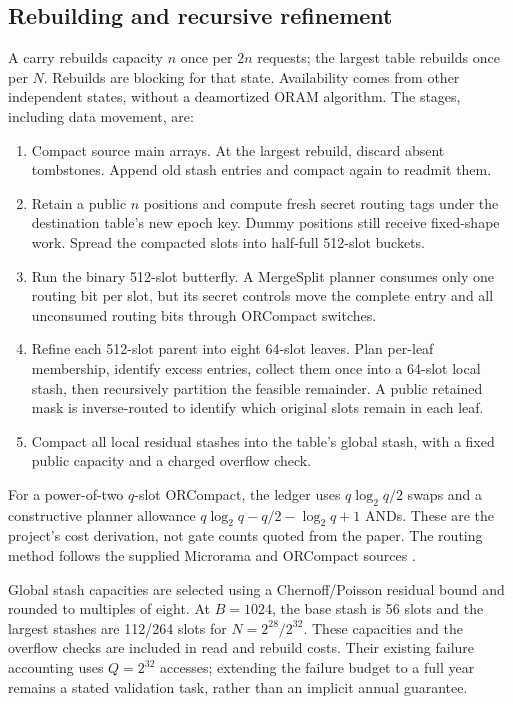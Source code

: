 \documentclass[11pt]{article}
\begin{document}
\subsection{Rebuilding and recursive refinement}
A carry rebuilds capacity $n$ once per $2n$ requests; the largest table
rebuilds once per $N$. Rebuilds are blocking for that state. Availability
comes from other independent states, without a deamortized ORAM algorithm.
The stages, including data movement, are:
\begin{enumerate}
\item Compact source main arrays. At the largest rebuild, discard absent
tombstones. Append old stash entries and compact again to readmit them.
\item Retain a public $n$ positions and compute fresh secret routing tags
under the destination table's new epoch key. Dummy positions still receive
fixed-shape work. Spread the compacted slots into half-full 512-slot buckets.
\item Run the binary 512-slot butterfly. A MergeSplit planner consumes only
one routing bit per slot, but its secret controls move the complete entry
and all unconsumed routing bits through ORCompact switches.
\item Refine each 512-slot parent into eight 64-slot leaves. Plan per-leaf
membership, identify excess entries, collect them once into a 64-slot local
stash, then recursively partition the feasible remainder. A public retained
mask is inverse-routed to identify which original slots remain in each leaf.
\item Compact all local residual stashes into the table's global stash,
with a fixed public capacity and a charged overflow check.
\end{enumerate}
For a power-of-two $q$-slot ORCompact, the ledger uses $q\log_2q/2$ swaps
and a constructive planner allowance $q\log_2q-q/2-\log_2q+1$ ANDs. These
are the project's cost derivation, not gate counts quoted from the paper.
The routing method follows the supplied Microrama and ORCompact sources
\cite{construction,orcompact}.

Global stash capacities are selected using a Chernoff/Poisson residual
bound and rounded to multiples of eight. At $B=1024$, the base stash is
56 slots and the largest stashes are 112/264 slots for $N=2^{28}/2^{32}$.
These capacities and the overflow checks are included in read and rebuild
costs. Their existing failure accounting uses $Q=2^{32}$ accesses;
extending the failure budget to a full year remains a stated validation
task, rather than an implicit annual guarantee.
\end{document}
